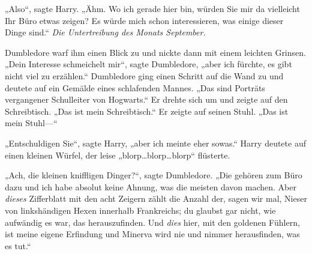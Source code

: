 „Also“, sagte Harry. „Ähm. Wo ich gerade hier bin, würden Sie mir da vielleicht Ihr Büro etwas zeigen? Es würde mich schon interessieren, was einige dieser Dinge sind.“ \emph{Die Untertreibung des Monats September.}

Dumbledore warf ihm einen Blick zu und nickte dann mit einem leichten Grinsen. „Dein Interesse schmeichelt mir“, sagte Dumbledore, „aber ich fürchte, es gibt nicht viel zu erzählen.“ Dumbledore ging einen Schritt auf die Wand zu und deutete auf ein Gemälde eines schlafenden Mannes. „Das sind Porträts vergangener Schulleiter von Hogwarts.“ Er drehte sich um und zeigte auf den Schreibtisch. „Das ist mein Schreibtisch.“ Er zeigte auf seinen Stuhl. „Das ist mein Stuhl—“

„Entschuldigen Sie“, sagte Harry, „aber ich meinte eher sowas.“ Harry deutete auf einen kleinen Würfel, der leise „blorp…blorp…blorp“ flüsterte.

„Ach, die kleinen kniffligen Dinger?“, sagte Dumbledore. „Die gehören zum Büro dazu und ich habe absolut keine Ahnung, was die meisten davon machen. Aber \emph{dieses} Zifferblatt mit den acht Zeigern zählt die Anzahl der, sagen wir mal, Nieser von linkshändigen Hexen innerhalb Frankreichs; du glaubst gar nicht, wie aufwändig es war, das herauszufinden. Und \emph{dies} hier, mit den goldenen Fühlern, ist meine eigene Erfindung und Minerva wird nie und nimmer herausfinden, was es tut.“

